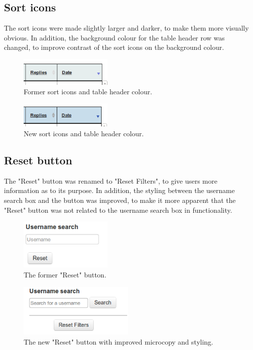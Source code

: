 \subsection{Sort icons}
The sort icons were made slightly larger and darker, to make them more visually obvious. In addition, the background colour for the table header row was changed, to improve contrast \citep[p. 650]{Galitz} of the sort icons on the background colour. 
\begin{figure}[h!]
    \centering
    \includegraphics[width=0.4\textwidth]{Figures/V2/oldsort.png}
 \caption{Former sort icons and table header colour.}
\end{figure}

\begin{figure}[h!]
    \centering
    \includegraphics[width=0.4\textwidth]{Figures/V2/newsort.png}
 \caption{New sort icons and table header colour.}
\end{figure}

\subsection{Reset button}
The "Reset" button was renamed to "Reset Filters", to give users more information \citep[p. 520]{Galitz} as to its purpose. In addition, the styling between the username search box and the button was improved, to make it more apparent that the "Reset" button was not related to the username search box in functionality. 
\begin{figure}[h!]
    \centering
    \includegraphics[width=0.4\textwidth]{Figures/V2/oldreset.png}
 \caption{The former "Reset" button.}
\end{figure}

\begin{figure}[h!]
    \centering
    \includegraphics[width=0.5\textwidth]{Figures/V2/newreset.png}
 \caption{The new "Reset" button with improved microcopy and styling.}
 \label{fig:newreset}
\end{figure}


